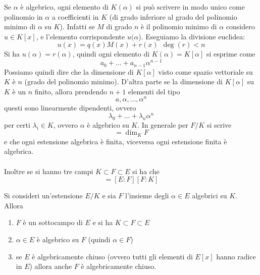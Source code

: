 \begin{osservazione}
	Se $\alpha$ è algebrico, ogni elemento di $K(\alpha)$ si può scrivere in modo unico come polinomio in $\alpha$ a coefficienti in $K$ (di grado inferiore al grado del polinomio minimo di $\alpha$ su $K$). Infatti se $M$ di grado $n$ è il polinomio minimo di $\alpha$ considero $u\in K[x]$, e l'elemento corrispondente $u(\alpha$). Eseguiamo la divisione euclidea:
	\begin{equation*}
	u(x)=q(x)M(x)+r(x) \ \ \deg(r)<n
	\end{equation*}
	Si ha $u(\alpha)=r(\alpha)$, quindi ogni elemento di $K(\alpha)=K[\alpha]$ si esprime come 
	\begin{equation*}
	a_0+\dots+a_{n-1}\alpha^{n-1}
	\end{equation*}
	Possiamo quindi dire che la dimensione di $K[\alpha]$ visto come spazio vettoriale su $K$ è $n$ (grado del polinomio minimo). D'altra parte se la dimensione di $K[\alpha]$ su $K$ è un $n$ finito, allora prendendo $n+1$ elementi del tipo
	\begin{equation*}
	a,\alpha,\dots,\alpha^n
	\end{equation*}
	questi sono linearmente dipendenti, ovvero
	\begin{equation*}
	\lambda_0+\dots+\lambda_n\alpha^n
	\end{equation*}
	per certi $\lambda_i\in K$, ovvero $\alpha$ è algebrico su $K$.
	In generale per $F/K$ si scrive 
	\begin{equation*}
	[F:K]=\dim_KF
	\end{equation*}
	e che ogni estensione algebrica è finita, viceversa ogni estensione finita è algebrica. \\ \\ Inoltre se si hanno tre campi $K\subset F\subset E$ si ha che 
	\begin{equation*}
	[E:K]=[E:F][F:K]
	\end{equation*}
\end{osservazione}
\begin{teorema}
	Si consideri un'estensione $E/K$ e sia $F$ l'insieme degli $\alpha\in E$ algebrici su $K$. Allora
	\begin{enumerate}
		\item $F$ è un sottocampo di $E$ e si ha $K\subset F\subset E$
		\item $\alpha\in E$ è algebrico su $F$ (quindi $\alpha\in F$)
		\item se $E$ è algebricamente chiuso (ovvero tutti gli elementi di $E[x]$ hanno radice in $E$) allora anche $F$ è algebricamente chiuso.
	\end{enumerate}
\end{teorema}

